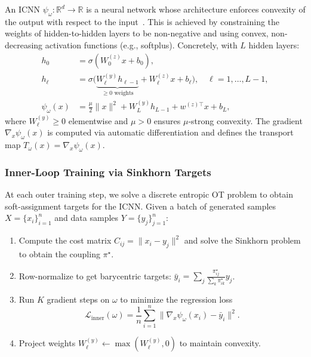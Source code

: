 \documentclass[10pt,conference,compsocconf]{IEEEtran}
\newcommand{\R}{\mathbb{R}}
\begin{document}
An ICNN $\psi_\omega : \R^d \to \R$ is a neural network whose architecture enforces convexity of the output with respect to the input~\cite{amos2017input}.
This is achieved by constraining the weights of hidden-to-hidden layers to be non-negative and using convex, non-decreasing activation functions (e.g., softplus).
Concretely, with $L$ hidden layers:
\begin{align}
  h_0 &= \sigma(W_0^{(z)} x + b_0), \nonumber\\
  h_\ell &= \sigma\!\bigl(\underbrace{W_\ell^{(y)} h_{\ell-1}}_{\geq 0 \text{ weights}} + W_\ell^{(z)} x + b_\ell\bigr), \quad \ell = 1,\ldots,L\!-\!1, \nonumber\\
  \psi_\omega(x) &= \tfrac{\mu}{2}\|x\|^2 + W_L^{(y)} h_{L-1} + w^{(z)\top}\! x + b_L,
\end{align}
where $W_\ell^{(y)} \geq 0$ elementwise and $\mu > 0$ ensures $\mu$-strong convexity.
The gradient $\nabla_x \psi_\omega(x)$ is computed via automatic differentiation and defines the transport map $T_\omega(x) = \nabla_x \psi_\omega(x)$. 

\subsubsection{Inner-Loop Training via Sinkhorn Targets}

At each outer training step, we solve a discrete entropic OT problem to obtain soft-assignment targets for the ICNN.
Given a batch of generated samples $X = \{x_i\}_{i=1}^n$ and data samples $Y = \{y_j\}_{j=1}^n$:

\begin{enumerate}
\item Compute the cost matrix $C_{ij} = \|x_i - y_j\|^2$ and solve the Sinkhorn problem to obtain the coupling $\pi^\star$.
\item Row-normalize to get barycentric targets: $\bar{y}_i = \sum_j \frac{\pi^\star_{ij}}{\sum_k \pi^\star_{ik}} y_j$.
\item Run $K$ gradient steps on $\omega$ to minimize the regression loss
\begin{equation}\label{eq:inner_loss}
  \mathcal{L}_{\text{inner}}(\omega) = \frac{1}{n}\sum_{i=1}^n \bigl\|\nabla_x \psi_\omega(x_i) - \bar{y}_i\bigr\|^2.
\end{equation}
\item Project weights $W_\ell^{(y)} \leftarrow \max(W_\ell^{(y)}, 0)$ to maintain convexity.
\end{enumerate}
\end{document}
